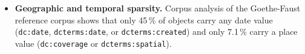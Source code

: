 \begin{itemize}
  \item \textbf{Geographic and temporal sparsity.} Corpus analysis of the Goethe-Faust
        reference corpus shows that only 45\,\% of objects carry any
        date value (\texttt{dc:date}, \texttt{dcterms:date}, or \texttt{dcterms:created})
        and only 7.1\,\% carry a place value (\texttt{dc:coverage} or
        \texttt{dcterms:spatial}).
\end{itemize}
